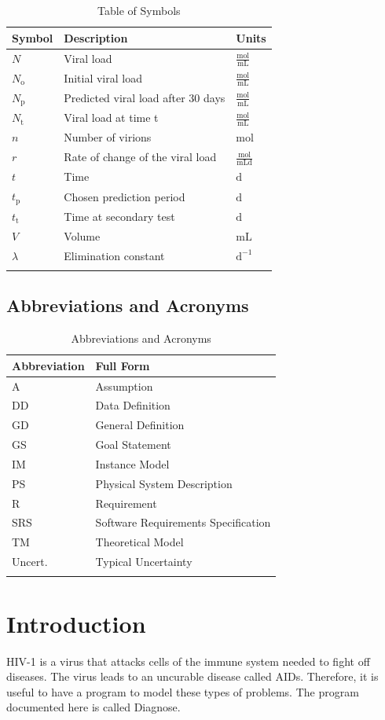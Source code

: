 \documentclass[12pt]{article}
\begin{document}
\begin{longtable}{l l l}
\toprule
\textbf{Symbol} & \textbf{Description} & \textbf{Units}
\\
\midrule
\endhead
$N$ & Viral load & $\frac{\text{mol}}{\text{mL}}$
\\
${N_{\text{o}}}$ & Initial viral load & $\frac{\text{mol}}{\text{mL}}$
\\
${N_{\text{p}}}$ & Predicted viral load after 30 days & $\frac{\text{mol}}{\text{mL}}$
\\
${N_{\text{t}}}$ & Viral load at time t & $\frac{\text{mol}}{\text{mL}}$
\\
$n$ & Number of virions & ${\text{mol}}$
\\
$r$ & Rate of change of the viral load & $\frac{\text{mol}}{\text{mL}\text{d}}$
\\
$t$ & Time & ${\text{d}}$
\\
${t_{\text{p}}}$ & Chosen prediction period & ${\text{d}}$
\\
${t_{\text{t}}}$ & Time at secondary test & ${\text{d}}$
\\
$V$ & Volume & ${\text{mL}}$
\\
$λ$ & Elimination constant & $\text{d}^{-1}$
\\
\bottomrule
\caption{Table of Symbols}
\label{Table:ToS}
\end{longtable}
\subsection{Abbreviations and Acronyms}
\label{Sec:TAbbAcc}
\begin{longtable}{l l}
\toprule
\textbf{Abbreviation} & \textbf{Full Form}
\\
\midrule
\endhead
A & Assumption
\\
DD & Data Definition
\\
GD & General Definition
\\
GS & Goal Statement
\\
IM & Instance Model
\\
PS & Physical System Description
\\
R & Requirement
\\
SRS & Software Requirements Specification
\\
TM & Theoretical Model
\\
Uncert. & Typical Uncertainty
\\
\bottomrule
\caption{Abbreviations and Acronyms}
\label{Table:TAbbAcc}
\end{longtable}
\section{Introduction}
\label{Sec:Intro}
HIV-1 is a virus that attacks cells of the immune system needed to fight off diseases. The virus leads to an uncurable disease called AIDs. Therefore, it is useful to have a program to model these types of problems. The program documented here is called Diagnose.
\end{document}
